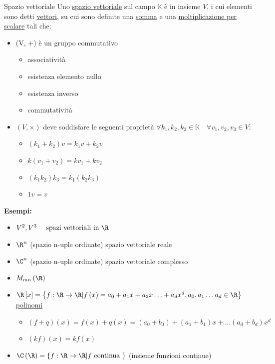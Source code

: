 \begin{definizione}{Spazio vettoriale}
	Uno \underline{spazio vettoriale} sul campo $\mathbb{K} $ è in insieme $V$, i cui elementi sono detti \underline{vettori}, su cui sono definite una \underline{somma} e una \underline{moltiplicazione per scalare} tali che:
	\begin{itemize}
		\item (V, +) è un gruppo commutativo
		      \begin{itemize}
			      \item associatività
			      \item esistenza elemento nullo
			      \item esistenza inverso
			      \item commutatività
		      \end{itemize}
		\item $\left( V, \times \right) $ deve soddisfare le seguenti proprietà $ \forall k_1,k_2,k_3 \in  \mathbb{K} \quad \forall v_1,v_2,v_3 \in V$:
		      \begin{itemize}
			      \item $\left( k_1+ k_2 \right) v= k_1v+ k_2v $
			      \item $k\left( v_1+v_2 \right) =kv_1+kv_2 $
			      \item $ \left( k_1k_2 \right) k_3= k_1\left( k_2k_3 \right) $
			      \item $1v=v $
		      \end{itemize}
	\end{itemize}
\end{definizione}

\textbf{Esempi:}
\begin{itemize}
	\item $V^2, V^3 \quad \text{ spazi vettoriali in  }\R $
	\item $\R^{n}$ (spazio n-uple ordinate) spazio vettoriale reale
	\item $\C^{n}$ (spazio n-uple ordinate) spazio vettoriale complesso
	\item $M_{mn}\left( \R \right) $
	\item $\R \left[ x \right] = \left\{ f : \R \to \R | f\left( x \right) = a_0 + a_1x + a_2 x\ldots + a_dx^{d}, a_0, a_1 \ldots a_d \in  \R\right\} $ \underline{polinomi}
	      \begin{itemize}
		      \item $\left( f+q \right) \left( x \right)= f\left( x \right) + q\left( x \right) = \left( a_0 + b_0 \right) + \left( a_1+b_1 \right) x + \ldots \left( a_d + b_d \right) x^{d} $
		      \item $\left( kf \right) \left( x \right) = kf\left( x \right) $
	      \end{itemize}
	\item $\C\left( \R \right) = \left\{ f:\R \to \R  | f \text{ continua } \right\} $ (insieme funzioni continue)
\end{itemize}
